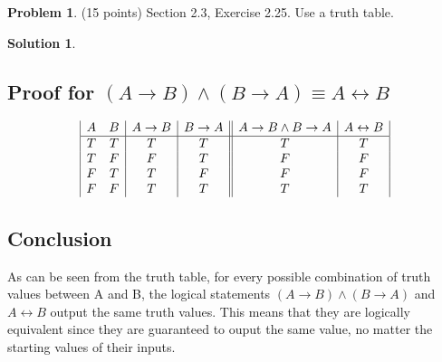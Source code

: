 \documentclass{article}
\theoremstyle{definition}
\newtheorem{problem}{Problem}
\newtheorem*{solution}{Solution}
\begin{document}
\newpage
\begin{problem} (15 points) Section 2.3, Exercise 2.25.
Use a truth table.
\end{problem}
\begin{solution} 
\hspace{1cm}
\subsection*{Proof for $(A \rightarrow B) \land (B \rightarrow A) \equiv A \leftrightarrow B$}
\hspace{1cm}
\begin{displaymath}
\begin{array}{|c c| c |c| |c| c|}
A & B & A \rightarrow B & B \rightarrow A & A \rightarrow B \land B \rightarrow A & A \leftrightarrow B\\
\hline
T & T & T & T & T & T\\
T & F & F & T & F & F\\
F & T & T & F & F & F\\
F & F & T & T & T & T\\ 
\end{array}
\end{displaymath}
\subsection*{Conclusion}
As can be seen from the truth table, for every possible combination of truth values between A and B, the logical statements $(A \rightarrow B) \land (B \rightarrow A)$ and $A \leftrightarrow B$ output the same truth values. This means that they are logically equivalent since they are guaranteed to ouput the same value, no matter the starting values of their inputs. 
\end{solution}
\end{document}
